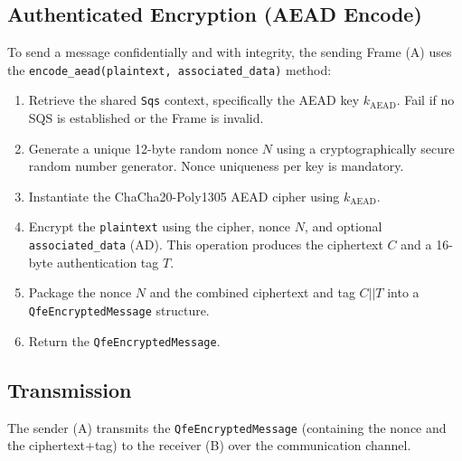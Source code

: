 \documentclass[11pt]{article}
\begin{document}
	\subsection{Authenticated Encryption (AEAD Encode)}
	To send a message confidentially and with integrity, the sending Frame (A) uses the \texttt{encode\_aead(plaintext, associated\_data)} method:
	\begin{enumerate}
		\item Retrieve the shared \texttt{Sqs} context, specifically the AEAD key $k_{\text{AEAD}}$. Fail if no SQS is established or the Frame is invalid.
		\item Generate a unique 12-byte random nonce $N$ using a cryptographically secure random number generator. Nonce uniqueness per key is mandatory.
		\item Instantiate the ChaCha20-Poly1305 AEAD cipher using $k_{\text{AEAD}}$.
		\item Encrypt the \texttt{plaintext} using the cipher, nonce $N$, and optional \texttt{associated\_data} (AD). This operation produces the ciphertext $C$ and a 16-byte authentication tag $T$.
		\item Package the nonce $N$ and the combined ciphertext and tag $C||T$ into a \texttt{QfeEncryptedMessage} structure.
		\item Return the \texttt{QfeEncryptedMessage}.
	\end{enumerate}
	
	\subsection{Transmission}
	The sender (A) transmits the \texttt{QfeEncryptedMessage} (containing the nonce and the ciphertext+tag) to the receiver (B) over the communication channel.
	
\end{document}
